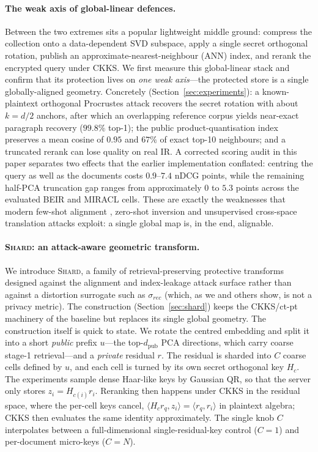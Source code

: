 \paragraph{The weak axis of global-linear defences.} Between the two
extremes sits a popular lightweight middle ground: compress the collection
onto a data-dependent SVD subspace, apply a single secret orthogonal
rotation, publish an approximate-nearest-neighbour (ANN) index, and rerank
the encrypted query under CKKS. We first measure this global-linear stack
and confirm that its protection lives on \emph{one weak axis}---the
protected store is a single globally-aligned geometry. Concretely
(Section~\ref{sec:experiments}): a known-plaintext orthogonal Procrustes
attack recovers the secret rotation with about $k=d/2$ anchors, after which
an overlapping reference corpus yields near-exact paragraph recovery
($99.8\%$ top-1); the public product-quantisation index preserves a mean
cosine of $0.95$ and $67\%$ of exact top-10 neighbours; and a truncated
rerank can lose quality on real IR. A corrected scoring audit in this paper
separates two effects that the earlier implementation conflated: centring the
query as well as the documents costs $0.9$--$7.4$ nDCG points, while the
remaining half-PCA truncation gap ranges from approximately $0$ to $5.3$
points across the evaluated BEIR and MIRACL cells. These are
exactly the weaknesses that modern few-shot alignment \cite{ref_algen},
zero-shot inversion \cite{ref_zsinvert} and unsupervised cross-space
translation \cite{ref_vec2vec} attacks exploit: a single global map is, in
the end, alignable.

\paragraph{\textsc{Shard}: an attack-aware geometric transform.} We
introduce \textsc{Shard}, a family of retrieval-preserving protective
transforms designed against the alignment and index-leakage attack surface
rather than against a distortion surrogate such as $\sigma_{rec}$ (which,
as we and others show, is not a privacy metric). The construction
(Section~\ref{sec:shard}) keeps the CKKS/ct-pt machinery of the baseline
but replaces its single global geometry. The construction itself is quick to state. We rotate the
centred embedding and split it into a short \emph{public} prefix $u$---the
top-$d_{\mathrm{pub}}$ PCA directions, which carry coarse stage-1
retrieval---and a \emph{private} residual $r$. The residual is sharded into
$C$ coarse cells defined by $u$, and each cell is turned by its own secret
orthogonal key $H_c$. The experiments sample dense Haar-like keys by Gaussian
QR, so that the server only stores $z_i = H_{c(i)} r_i$. Reranking then happens under CKKS in
the residual space, where the per-cell keys cancel,
$\langle H_c r_q, z_i\rangle=\langle r_q, r_i\rangle$ in plaintext algebra;
CKKS then evaluates the same identity approximately. The single knob $C$
interpolates between a full-dimensional single-residual-key control
($C{=}1$) and per-document micro-keys
($C{=}N$).

